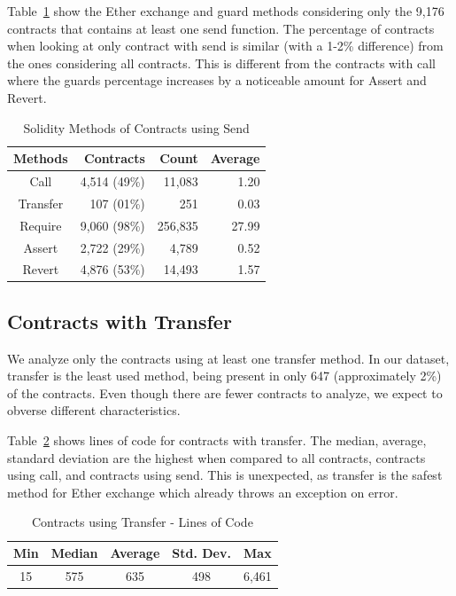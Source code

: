 \documentclass[10pt,conference]{IEEEtran}
\begin{document}
Table~\ref{tab:send} show the Ether exchange and guard methods considering only the 9,176 contracts that contains at least one send function.  The percentage of contracts when looking at only contract with send is similar (with a 1-2\% difference) from the ones considering all contracts.  This is different from the contracts with call where the guards percentage increases by a noticeable amount for Assert and Revert. 

\begin{table}
\center
  \caption{Solidity Methods of Contracts using Send}
  \label{tab:send}
  \begin{tabular}{crrr}
    \hline
    Methods & Contracts & Count & Average \\
    \hline
    Call & 4,514 (49\%) & 11,083 & 1.20\\
    Transfer &107 (01\%) & 251 & 0.03\\
    Require & 9,060 (98\%) &256,835 & 27.99\\
    Assert & 2,722 (29\%) & 4,789 & 0.52\\
    Revert & 4,876 (53\%) & 14,493 & 1.57 \\
    \hline
\end{tabular}
\end{table}

\subsection{Contracts with Transfer}

We analyze only the contracts using at least one transfer method. In our dataset, transfer is the least used method, being present in only 647 (approximately 2\%) of the contracts.  Even though there are fewer contracts to analyze, we expect to obverse different characteristics. 

Table~\ref{tab:transfer-loc} shows lines of code for contracts with transfer.  The median, average, standard deviation are the highest when compared to all contracts, contracts using call, and contracts using send.  This is unexpected, as transfer is the safest method for Ether exchange which already throws an exception on error.

\begin{table}[t]
\center
  \caption{Contracts using Transfer - Lines of Code}
  \label{tab:transfer-loc}
  \begin{tabular}{c c c c c}
    \hline
    Min & Median & Average & Std. Dev. & Max \\
    \hline
   15 & 575 & 635 & 498 & 6,461 \\
  \hline
\end{tabular}
\end{table}
\end{document}
